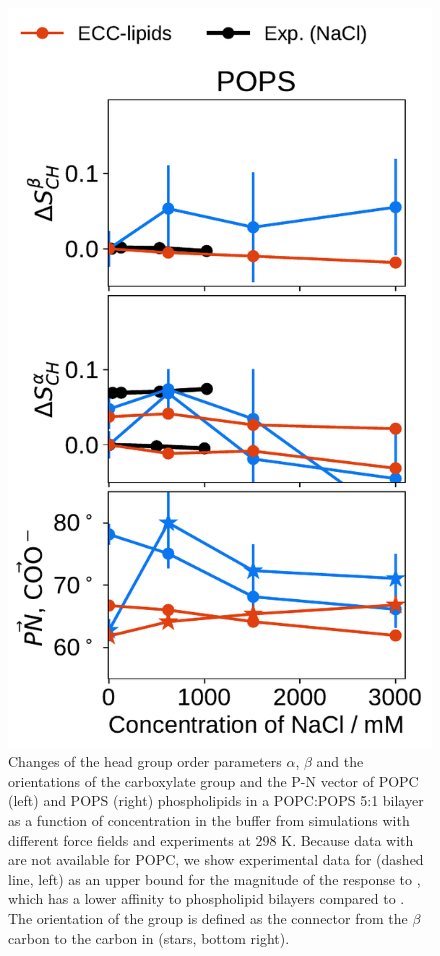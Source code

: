 \documentclass[journal=jpcbfk,manuscript=article]{achemso}
\newlength{\figheight}
\begin{document}
\begin{figure}[tbp!]
  \includegraphics[height=\figheight]{../img/ecc_pops/order_parameters_changes_ecc-lip_L14_A-B-PN-COO_POPS_nacl.pdf} 
  \caption{\label{fig:delta_ordPar_NaCl_PCPS} 
    Changes of the head group order parameters $\alpha$, $\beta$ and the orientations of the carboxylate group and the P-N vector  
    of POPC (left) and POPS (right) phospholipids in a POPC:POPS 5:1 bilayer 
    as a function of  concentration in the buffer 
    from simulations with different force fields and experiments at 298 K. \citep{roux90}
    Because data with  are not available for POPC, 
    we show experimental data for  (dashed line, left) 
    as an upper bound for the magnitude of the response to , 
    which has a lower affinity to phospholipid bilayers compared to  \citep{roux90}. 
    The orientation of the  group is defined as 
    the connector from the $\beta$ carbon to the carbon in  (stars, bottom right). 
  }
  \end{figure} 
\end{document}
